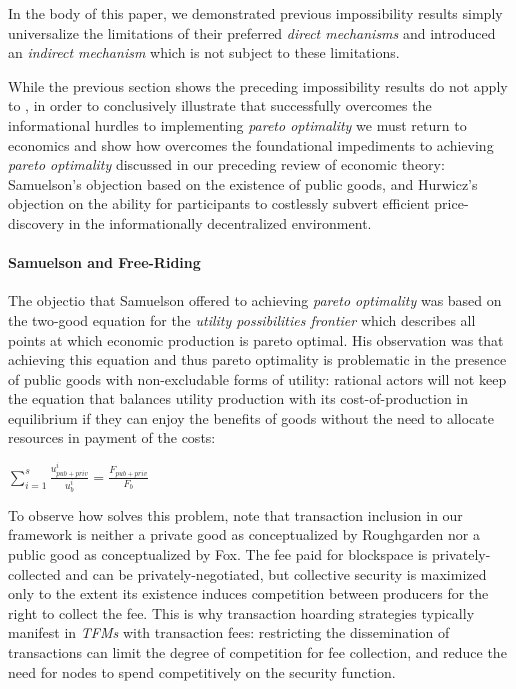 
In the body of this paper, we demonstrated previous impossibility results simply universalize the limitations of their preferred \textit{direct mechanisms} and introduced an \textit{indirect mechanism} which is not subject to these limitations.

While the previous section shows the preceding impossibility results do not apply to \ourTFM, in order to conclusively illustrate that \ourTFM successfully overcomes the informational hurdles to implementing \textit{pareto optimality} we must return to economics and show how \ourTFM overcomes the foundational impediments to achieving \textit{pareto optimality} discussed in our preceding review of economic theory: Samuelson's objection based on the existence of public goods, and Hurwicz's objection on the ability for participants to costlessly subvert efficient price-discovery in the informationally decentralized environment.

\paragraph{Samuelson and Free-Riding}

The objectio that Samuelson offered to achieving \textit{pareto optimality} was based on the two-good equation for the \textit{utility possibilities frontier} which describes all points at which economic production is pareto optimal. His observation was that achieving this equation and thus pareto optimality is problematic in the presence of public goods with non-excludable forms of utility: rational actors will not keep the equation that balances utility production with its cost-of-production in equilibrium if they can enjoy the benefits of goods without the need to allocate resources in payment of the costs:

\LARGE
\begin{adjustwidth}{1.5em}{1.5em}
\begin{math}
\sum_{i=1}^{s} \frac{u_{{pub}+{priv}}^i}{u_b^i} = \frac{F_{{pub}+{priv}}}{F_b}
\end{math}
\end{adjustwidth}
\normalsize

To observe how \ourTFM solves this problem, note that transaction inclusion in our framework is neither a private good as conceptualized by Roughgarden nor a public good as conceptualized by Fox. The fee paid for blockspace is privately-collected and can be privately-negotiated, but collective security is maximized only to the extent its existence induces competition between producers for the right to collect the fee. This is why transaction hoarding strategies typically manifest in \textit{TFMs} with transaction fees: restricting the dissemination of transactions can limit the degree of competition for fee collection, and reduce the need for nodes to spend competitively on the security function.

